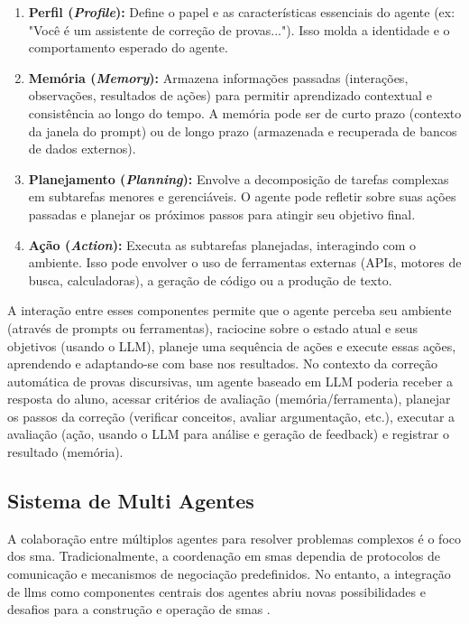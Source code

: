 \begin{enumerate}
    \item \textbf{Perfil (\textit{Profile}):} Define o papel e as características essenciais do agente (ex: "Você é um assistente de correção de provas..."). Isso molda a identidade e o comportamento esperado do agente.

    \item \textbf{Memória (\textit{Memory}):} Armazena informações passadas (interações, observações, resultados de ações) para permitir aprendizado contextual e consistência ao longo do tempo. A memória pode ser de curto prazo (contexto da janela do prompt) ou de longo prazo (armazenada e recuperada de bancos de dados externos).

    \item \textbf{Planejamento (\textit{Planning}):} Envolve a decomposição de tarefas complexas em subtarefas menores e gerenciáveis. O agente pode refletir sobre suas ações passadas e planejar os próximos passos para atingir seu objetivo final.

    \item  \textbf{Ação (\textit{Action}):} Executa as subtarefas planejadas, interagindo com o ambiente. Isso pode envolver o uso de ferramentas externas (APIs, motores de busca, calculadoras), a geração de código ou a produção de texto.
\end{enumerate}

A interação entre esses componentes permite que o agente perceba seu ambiente (através de prompts ou ferramentas), raciocine sobre o estado atual e seus objetivos (usando o LLM), planeje uma sequência de ações e execute essas ações, aprendendo e adaptando-se com base nos resultados. No contexto da correção automática de provas discursivas, um agente baseado em LLM poderia receber a resposta do aluno, acessar critérios de avaliação (memória/ferramenta), planejar os passos da correção (verificar conceitos, avaliar argumentação, etc.), executar a avaliação (ação, usando o LLM para análise e geração de feedback) e registrar o resultado (memória).

\subsection{Sistema de Multi Agentes}

A colaboração entre múltiplos agentes para resolver problemas complexos é o foco dos \gls{sma}. Tradicionalmente, a coordenação em \gls{sma}s dependia de protocolos de comunicação e mecanismos de negociação predefinidos. No entanto, a integração de \gls{llm}s como componentes centrais dos agentes abriu novas possibilidades e desafios para a construção e operação de \gls{sma}s \cite{chen_survey_2025, yan_beyond_2025}.

